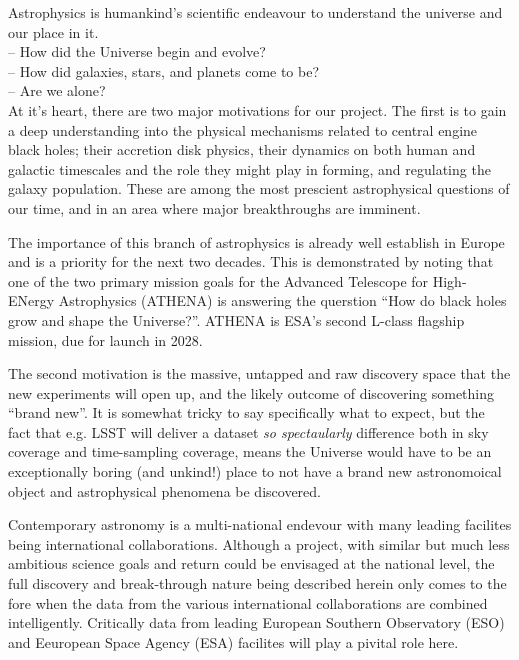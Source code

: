 \documentclass[oneside, a4paper, onecolumn, 11pt]{article}
\begin{document}
\smallskip
\smallskip
\noindent
Astrophysics is humankind's scientific endeavour to understand the
universe and our place in it. \\
-- How did the Universe begin and evolve? \\
-- How did galaxies, stars, and planets come to be?\\
-- Are we alone? \\

\smallskip
\smallskip
\noindent
At it's heart, there are two major motivations for our project. 
The first is to gain a deep understanding into the physical mechanisms 
related to central engine black holes; their accretion disk physics, their 
dynamics on both human and galactic timescales and the role they might 
play in forming, and regulating the galaxy population. These are among the 
most prescient astrophysical questions of our time, and in an area where 
major breakthroughs are imminent. 

\smallskip
\smallskip
\noindent
The importance of this branch of astrophysics is already well establish in 
Europe and is a priority for the next two decades. This is demonstrated by noting that
one of the two primary mission goals for the Advanced Telescope for High-ENergy Astrophysics (ATHENA) is 
answering the querstion ``How do black holes grow and shape the Universe?''. 
ATHENA is ESA's second L-class flagship mission, due for launch in 2028.

\smallskip
\smallskip
\noindent
The second motivation is the massive, untapped and raw discovery space 
that the new experiments will open up, and the likely outcome of discovering 
something ``brand new''. It is somewhat tricky to say specifically what to 
expect, but the fact that e.g. LSST will deliver a dataset {\it so spectaularly} 
difference both in sky coverage and time-sampling coverage, means the 
Universe would have to be an exceptionally boring (and unkind!) place to 
not have a brand new astronomoical object and astrophysical phenomena 
be discovered. 


\smallskip
\smallskip
\noindent
Contemporary astronomy is a multi-national endevour with many leading facilites being 
international collaborations. Although a project, with similar but much less ambitious science 
goals and return could be envisaged at the national level, the full discovery and break-through nature being described herein only comes to the fore
when the data from the various international collaborations are combined intelligently. 
Critically data from leading  European Southern Observatory (ESO) and 
Eeuropean Space Agency (ESA) facilites will play a pivital role here. 
\end{document}
